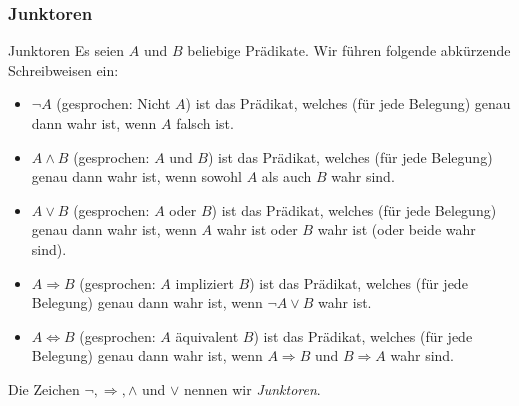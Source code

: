 \begin{comment}
\begin{remark}
  Ist $A(x)$ ein Prädikat und ist $y$ ein mathematisches Objekt (z.B. $y=17$) so, dass $A(y)$ eine wahre Aussage ist, dann sagen wir, dass das Prädikat (manchmal auch die Eigenschaft) $A$ auf $y$ zutrifft. Das Prädikat $x>100$ trifft zum Beispiel auf die Zahl $232$ zu, weil $232>100$ eine wahre Aussage ist.
\end{remark}
\end{comment}

\subsubsection{Junktoren}

\begin{concept}{Junktoren}
Es seien $A$ und $B$ beliebige Prädikate. Wir führen folgende abkürzende Schreibweisen ein:
\begin{itemize}
\item $\neg A$ (gesprochen: Nicht $A$) ist das Prädikat, welches (für jede Belegung) genau dann wahr ist, wenn $A$ falsch ist.
 \item $A\wedge B$ (gesprochen: $A$ und $B$)  ist das Prädikat, welches (für jede Belegung) genau dann wahr ist, wenn sowohl $A$ als auch $B$ wahr sind.
\item $A\vee B$ (gesprochen: $A$ oder $B$)  ist das Prädikat, welches (für jede Belegung) genau dann wahr ist, wenn $A$ wahr ist oder $B$ wahr ist (oder beide wahr sind).
\item $A\Rightarrow B$ (gesprochen: $A$ impliziert $B$) ist das Prädikat, welches (für jede Belegung) genau dann wahr ist, wenn $\neg A\vee B$ wahr ist.
\item $A\Leftrightarrow B$ (gesprochen: $A$ äquivalent $B$)  ist das Prädikat, welches (für jede Belegung) genau dann wahr ist, wenn $A\Rightarrow B$ und $B\Rightarrow A$ wahr sind.
\end{itemize}
Die Zeichen $\neg,\Rightarrow,\wedge$ und $\vee$ nennen wir \textit{Junktoren}.
\end{concept}

\begin{comment}
\begin{remark}
Das Prädikat $A\Rightarrow B$ besagt, dass in jedem Fall in dem $A$ wahr ist auch $B$ wahr sein muss.
Die Äquivalenz zweier Prädikate besagt also, dass diese stets denselben Wahrheitswert haben. Umgangssprachlich wird oft vorausgesetzt, dass zwischen den Prädikaten $A$ und $B$ ein ``inhaltlicher Zusammenhang'' bestehen muss, damit $A\Rightarrow B$ gelten kann. Dies ist in der mathematischen Logik nicht der Fall. Die Aussagen
\begin{align*}
\textit{Es gibt Einhörner}\Rightarrow 8\textit{ ist eine Primzahl}
\end{align*}
und
\begin{align*}
\textit{Spinat ist grün}\Rightarrow 2\textit{ ist eine Primzahl}
\end{align*}
sind beispielsweise beide (mathematisch gesehen) wahr.
\end{remark}
\end{comment}




